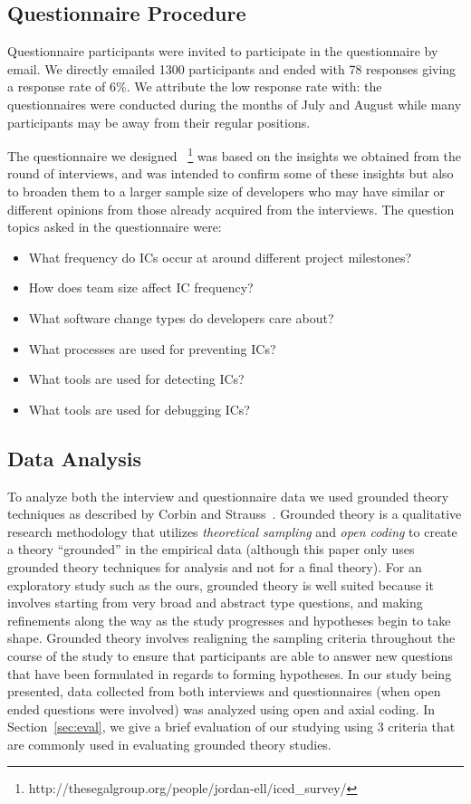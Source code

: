 \documentclass[conference]{IEEEtran}
\begin{document}
\subsection{Questionnaire Procedure}

Questionnaire participants were invited to participate in the questionnaire by email. We directly emailed 1300 participants and ended with 78 responses
giving a response rate of 6\%. We attribute the low response rate with: the questionnaires
were conducted during the months of July and August while many participants may be away from their regular positions.

The questionnaire we designed ~\footnote{http://thesegalgroup.org/people/jordan-ell/iced\_survey/}
was based on the insights we obtained from the round of interviews, and was intended to confirm some of these insights but also to broaden them to a larger sample size of developers who may have similar or different opinions from those already acquired from the interviews. The question topics asked in the questionnaire were:

\begin{itemize}
\item What frequency do ICs occur at around different project milestones?
\item How does team size affect IC frequency?
\item What software change types do developers care about?
\item What processes are used for preventing ICs?
\item What tools are used for detecting ICs?
\item What tools are used for debugging ICs?
\end{itemize}

\subsection{Data Analysis}
To analyze both the interview and questionnaire data we used grounded theory techniques as described by Corbin and Strauss~\cite{Corbin:1998:SP}.
Grounded theory is a qualitative research methodology that utilizes \textit{theoretical sampling} and
\textit{open coding} to create a theory ``grounded'' in the empirical data (although this paper only uses grounded
theory techniques for analysis and not for a final theory). For an exploratory study such as
the ours, grounded theory is well suited because it involves starting from very broad and abstract type questions, and
making refinements along the way as the study progresses and hypotheses begin to take shape. Grounded theory involves
realigning the sampling criteria throughout the course of the study to ensure that participants are able to answer new
questions that have been formulated in regards to forming hypotheses. In our study being presented, data collected from
both interviews and questionnaires (when open ended questions were involved) was analyzed using open and axial coding.
In Section~\ref{sec:eval}, we give a brief evaluation of our studying using
3 criteria that are commonly used in evaluating grounded theory studies.
\end{document}
